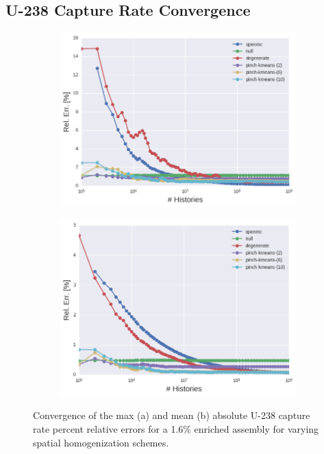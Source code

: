 \clearpage

\subsection{U-238 Capture Rate Convergence}
\label{subsec:chap11-capture-converge}

\clearpage

\begin{figure}[h!]
\centering
\begin{subfigure}{\textwidth}
  \centering
  \includegraphics[width=0.9\linewidth]{figures/results/assm-16/no-transform/evo-capture-max}
  \caption{}
  \label{fig:chap11-assm-1.6-capture-converge-max}
\end{subfigure}
\begin{subfigure}{\textwidth}
  \centering
  \includegraphics[width=0.9\linewidth]{figures/results/assm-16/no-transform/evo-capture-mean}
  \caption{}
  \label{fig:chap11-assm-1.6-capture-converge-mean}
\end{subfigure}
\vspace{2mm}
\caption[Fission rate covergence for a 1.6\% enriched assembly]{Convergence of the max (a) and mean (b) absolute U-238 capture rate percent relative errors for a 1.6\% enriched assembly for varying spatial homogenization schemes.}
\label{fig:chap11-assm-1.6-capture-converge}
\end{figure}


